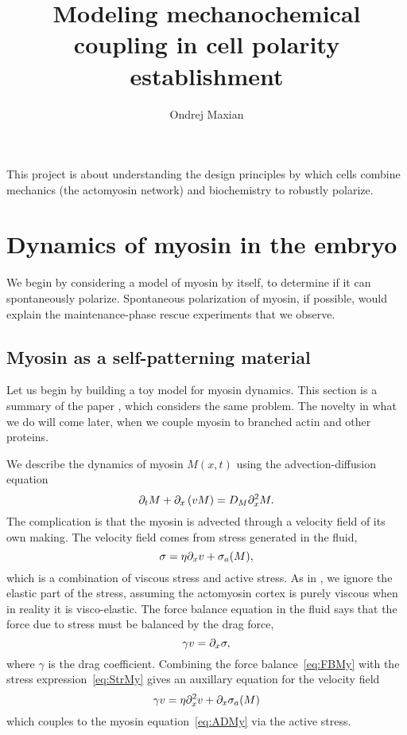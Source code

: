 \documentclass[11pt]{article}
\title{Modeling mechanochemical coupling in cell polarity establishment  \vspace{-0.5 cm}}
\author{Ondrej Maxian  \vspace{-0.75 cm}}
\newcommand{\6}[1]{#1_{\text{6}}}
\newcommand{\3}[1]{#1_{\text{3}}}
\begin{document}
\maketitle
This project is about understanding the design principles by which cells combine mechanics (the actomyosin network) and biochemistry to robustly polarize. 


\section{Dynamics of myosin in the embryo}
We begin by considering a model of myosin by itself, to determine if it can spontaneously polarize. Spontaneous polarization of myosin, if possible, would explain the maintenance-phase rescue experiments that we observe.

\subsection{Myosin as a self-patterning material} 
Let us begin by building a toy model for myosin dynamics. This section is a summary of the paper \cite{bois2011pattern}, which considers the same problem. The novelty in what we do will come later, when we couple myosin to branched actin and other proteins. 

We describe the dynamics of myosin $M(x,t)$ using the advection-diffusion equation
\begin{equation}
\label{eq:ADMy}
\partial_t M + \partial_x \left(v M\right) = D_M \partial_x^2 M.
\end{equation}
The complication is that the myosin is advected through a velocity field of its own making. The velocity field comes from stress generated in the fluid, 
\begin{equation}
\label{eq:StrMy}
\sigma = \eta \partial_x{v} + \sigma_a(M),
\end{equation}
which is a combination of viscous stress and active stress. As in \cite{bois2011pattern}, we ignore the elastic part of the stress, assuming the actomyosin cortex is purely viscous when in reality it is visco-elastic. The force balance equation in the fluid says that the force due to stress must be balanced by the drag force, 
\begin{equation}
\label{eq:FBMy}
\gamma v = \partial_x \sigma,
\end{equation}
where $\gamma$ is the drag coefficient. Combining the force balance\ \eqref{eq:FBMy} with the stress expression\ \eqref{eq:StrMy} gives an auxillary equation for the velocity field
\begin{equation}
\gamma v = \eta \partial_x^2 v + \partial_x \sigma_a(M)
\end{equation}
which couples to the myosin equation\ \eqref{eq:ADMy} via the active stress.
\end{document}
